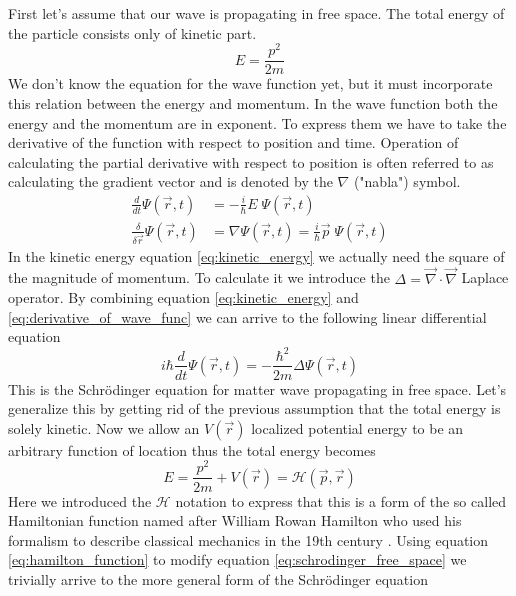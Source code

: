 First let's assume that our wave is propagating in free space.
The total energy of the particle consists only of kinetic part.
\begin{equation}
	\label{eq:kinetic_energy}
	E=\frac{p^2}{2m}
\end{equation}
We don't know the equation for the wave function yet, but it must incorporate this relation between the energy and momentum.
In the wave function both the energy and the momentum are in exponent.
To express them we have to take the derivative of the function with respect to position and time.
Operation of calculating the partial derivative with respect to position is often referred to as calculating the gradient vector and is denoted by the $\nabla$ ("nabla") symbol.
\begin{equation}
	\label{eq:derivative_of_wave_func}
	\begin{split}
		\frac{d}{dt}\Psi(\vec{r}, t) &= -\frac{i}{\hbar}E\;\Psi(\vec{r}, t)\\
		\frac{\delta}{\delta\vec{r}}\Psi(\vec{r}, t) &= \nabla \Psi(\vec{r}, t) =	\frac{i}{\hbar}\vec{p}\;\Psi(\vec{r}, t)
	\end{split}
\end{equation}
In the kinetic energy equation \ref{eq:kinetic_energy} we actually need the square of the magnitude of momentum.
To calculate it we introduce the $\Delta = \vec{\nabla} \cdot \vec{\nabla}$ Laplace operator.
By combining equation \ref{eq:kinetic_energy} and \ref{eq:derivative_of_wave_func} we can arrive to the following linear differential equation
\begin{equation}
	\label{eq:schrodinger_free_space}
	i \hbar \frac{d}{dt}\Psi(\vec{r}, t) = - \frac{\hbar^2}{2m}\Delta\Psi(\vec{r}, t)
\end{equation}
This is the Schrödinger equation for matter wave propagating in free space.
Let's generalize this by getting rid of the previous assumption that the total energy is solely kinetic.
Now we allow an $V(\vec{r})$ localized potential energy to be an arbitrary function of location thus the total energy becomes
\begin{equation}
	\label{eq:hamilton_function}
	E = \frac{p^2}{2m} + V(\vec{r}) = \mathcal{H}(\vec{p}, \vec{r})
\end{equation}
Here we introduced the $\mathcal{H}$ notation to express that this is a form of the so called Hamiltonian function named after William Rowan Hamilton who used his formalism to describe classical mechanics in the 19th century \cite{Hamilton1833}.
Using equation \ref{eq:hamilton_function} to modify equation \ref{eq:schrodinger_free_space} we trivially arrive to the more general form of the Schrödinger equation
